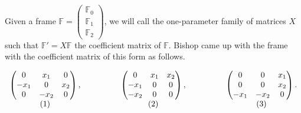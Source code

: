 \documentclass[a4paper]{amsart}
\theoremstyle{definition}
\theoremstyle{remark}
\numberwithin{equation}{section}
\begin{document}
Given a frame $\mathbb{F} = \begin{pmatrix}
\mathbb{F}_0 \\
\mathbb{F}_1 \\
\mathbb{F}_2
\end{pmatrix}$, we will call the one-parameter family of matrices $X$ such that $\mathbb{F}' = X \mathbb{F}$ the coefficient matrix of $\mathbb{F}$.
Bishop came up with the frame with the coefficient matrix of this form as follows.

\[
\begin{array}{c c c}
\left(\begin{matrix}
0 & x_{1} & 0 \\
-x_{1} & 0 & x_{2} \\
0 & -x_{2} & 0
\end{matrix}\right), 
& \hspace{40pt} 
\left(\begin{matrix}
0 & x_{1} & x_{2} \\
-x_{1} & 0 & 0 \\
-x_{2} & 0 & 0
\end{matrix}\right),
& \hspace{40pt} 
\left(\begin{matrix}
0 & 0 & x_{1} \\
0 & 0 & x_{2} \\
-x_{1} & -x_{2} & 0
\end{matrix}\right). \\
(1) & \hspace{40pt} (2) & \hspace{40pt} (3)
\end{array}
\]
\end{document}
